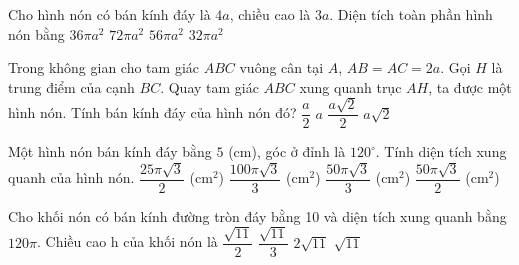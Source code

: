 \begin{ex}%
	Cho hình nón có bán kính đáy là $4a$, chiều cao là $3a$. Diện tích toàn phần hình nón bằng 
	\choice
	{\True $36\pi a^2$}
	{$72\pi a^2$}
	{$56\pi a^2$}
	{$32\pi a^2$}
\end{ex}
\begin{ex}%
	Trong không gian cho tam giác $ABC$ vuông cân tại $A$, $AB=AC=2a$. Gọi $H$ là trung điểm của cạnh $BC$. Quay tam giác $ABC$ xung quanh trục $AH$, ta được một hình nón. Tính bán kính đáy của hình nón đó?
	\choice
	{$\dfrac{a}{2}$}
	{$a$}
	{$\dfrac{a\sqrt{2}}{2}$}
	{\True $a\sqrt{2}$}
\end{ex}
\begin{ex}%
	Một hình nón bán kính đáy bằng $5$ (cm), góc ở đỉnh là $120^{\circ}$. Tính diện tích xung quanh của hình nón. 
	\choice
	{$\dfrac{25\pi\sqrt{3}}{2}$ (cm$^2$)}
	{$\dfrac{100\pi\sqrt{3}}{3}$ (cm$^2$)}
	{\True $\dfrac{50\pi\sqrt{3}}{3}$ (cm$^2$)}
	{$\dfrac{50\pi\sqrt{3}}{2}$ (cm$^2$)}
\end{ex}
\begin{ex}%
	Cho khối nón có bán kính đường tròn đáy bằng 10 và diện tích xung quanh bằng $120\pi$. Chiều cao h của khối nón là 
	\choice
	{$\dfrac{\sqrt{11}}{2}$}
	{$\dfrac{\sqrt{11}}{3}$}
	{\True $2\sqrt{11}$}
	{$\sqrt{11}$}
\end{ex}
